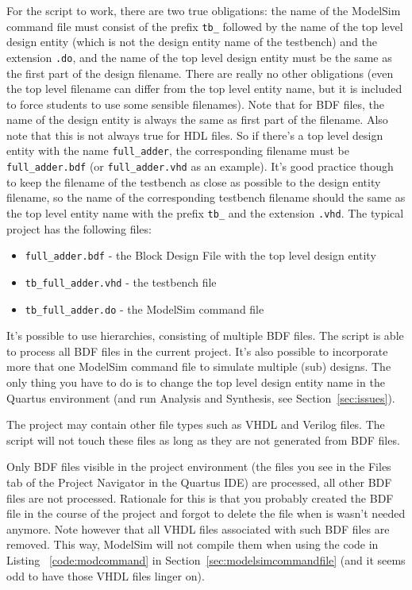 \documentclass[11pt,a4paper,final,oneside,titlepage,fleqn]{article}
\begin{document}
For the script to work, there are two true obligations: the name of the
ModelSim command file must consist of the prefix \texttt{tb\_} followed by the
name of the top level design entity (which is not the design entity name of
the testbench) and the extension \texttt{.do}, and the name of the top level
design entity must be the same as the first part of the design filename.
There are really no other obligations (even the top level filename can
differ from the top level entity name, but it is included to force students
to use some sensible filenames).
Note that for BDF files, the name of the design entity is always the same as
first part of the filename. Also note that this is not always true for HDL
files. So if there's a top level design entity with the name
\texttt{full\_adder}, the corresponding filename must be
\texttt{full\_adder.bdf} (or \texttt{full\_adder.vhd} as an example).
It's good practice though to keep the filename of
the testbench as close as possible to the design entity filename, so the name
of the corresponding testbench filename should the same as the top level entity
name with the prefix \texttt{tb\_} and the extension \texttt{.vhd}. The typical
project has the following files:

\begin{itemize}[label=,itemsep=0pt]
\item \texttt{full\_adder.bdf} - the Block Design File with the top level design entity
\item \texttt{tb\_full\_adder.vhd} - the testbench file
\item \texttt{tb\_full\_adder.do} - the ModelSim command file
\end{itemize}

\noindent
It's possible to use hierarchies, consisting of multiple BDF files. The script
is able to process all BDF files in the current project. It's also possible
to incorporate more that one ModelSim command file to simulate multiple
(sub) designs. The only thing you have to do is to change the top level design
entity name in the Quartus environment (and run Analysis and Synthesis, see
Section~\ref{sec:issues}).

The project may contain other file types such as VHDL and Verilog files. The
script will not touch these files as long as they are not generated from BDF
files.

Only BDF files visible in the project environment (the files you see in the
Files tab of the Project Navigator in the Quartus IDE) are processed, all
other BDF files are not processed. 
Rationale for this is that you probably created the BDF file in the course of
the project and forgot to delete the file when is wasn't needed anymore.
Note however that all VHDL files associated with such BDF files are removed.
This way, ModelSim will not compile them when using the code in Listing~%
\ref{code:modcommand} in Section~\ref{sec:modelsimcommandfile} (and it
seems odd to have those VHDL files linger on).
\end{document}

